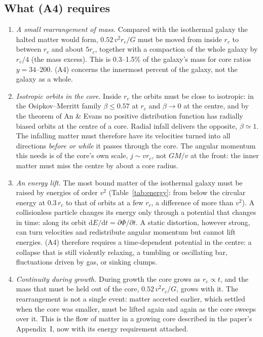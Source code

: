\documentclass[11pt,a4paper]{article}
\newcommand{\rc}{r_c}
\newcommand{\dd}{\mathrm{d}}
\begin{document}
\subsection{What (A4) requires}
\begin{enumerate}
\item \emph{A small rearrangement of mass.} Compared with the isothermal galaxy the
  halted matter would form, $0.52\,v^2\rc/G$ must be moved from inside $\rc$ to
  between $\rc$ and about $5\rc$, together with a compaction of the whole galaxy by
  $\rc/4$ (the mass excess). This is 0.3--1.5\% of the galaxy's mass for core ratios
  $y=34$--200. (A4) concerns the innermost percent of the galaxy, not the galaxy as
  a whole.

\item \emph{Isotropic orbits in the core.} Inside $\rc$ the orbits must be close to
  isotropic: in the Osipkov--Merritt family $\beta\le0.57$ at $\rc$ and $\beta\to0$
  at the centre, and by the theorem of An \& Evans no positive distribution function
  has radially biased orbits at the centre of a core. Radial infall delivers the
  opposite, $\beta\simeq1$. The infalling matter must therefore have its velocities
  turned into all directions \emph{before or while} it passes through the core.
  The angular momentum this needs is of the core's own scale, $j\sim v\rc$, not
  $GM/v$ at the front: the inner matter must miss the centre by about a core radius.

\item \emph{An energy lift.} The most bound matter of the isothermal galaxy must be
  raised by energies of order $v^2$ (Table~\ref{tab:energy}: from below the circular
  energy at $0.3\,\rc$ to that of orbits at a few $\rc$, a difference of more than
  $v^2$). A collisionless particle changes its energy only through a potential that
  changes in time: along its orbit $\dd E/\dd t=\partial\Phi/\partial t$. A static
  distortion, however strong, can turn velocities and redistribute angular momentum
  but cannot lift energies. (A4) therefore requires a time-dependent potential in
  the centre: a collapse that is still violently relaxing, a tumbling or oscillating
  bar, fluctuations driven by gas, or sinking clumps.

\item \emph{Continuity during growth.} During growth the core grows as
  $\rc\propto t$, and the mass that must be held out of the core,
  $0.52\,v^2\rc/G$, grows with it. The rearrangement is not a single event: matter
  accreted earlier, which settled when the core was smaller, must be lifted again
  and again as the core sweeps over it. This is the flow of matter in a growing core
  described in the paper's Appendix~I, now with its energy requirement attached.


\end{enumerate}
\end{document}
